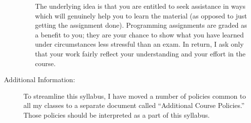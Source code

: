 \documentclass [letterpaper,11pt]{article}
\begin{document}
\begin{description}
\begin{itemize}
\begin{itemize}
                        \end{itemize}
        
        The underlying idea is that you are entitled to seek assistance in ways which will genuinely help you to learn the material (as opposed to just getting the assignment done).  Programming assignments are graded as a benefit to you;  they are your chance to show what you have learned under circumstances less stressful than an exam.  In return, I ask only that your work fairly reflect your understanding and your effort in the course.
        \end{itemize}


\item[Additional Information:] To streamline this syllabus, I have moved a number of policies
common to all my classes to a separate document called ``Additional Course Policies.'' 
Those policies should be interpreted as a part of this syllabus.






\end{description}
\end{document}
